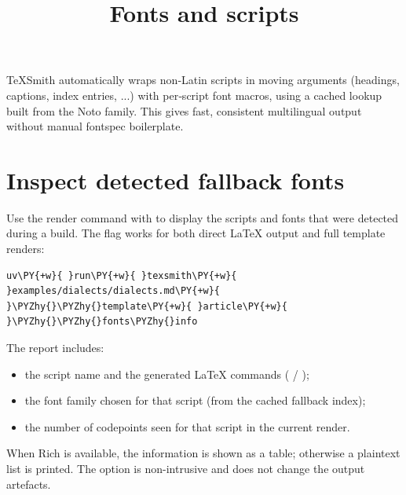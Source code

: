 \documentclass[a4paper,twoside]{article}
\title{Fonts and scripts}
\author{}\date{}
\begin{document}
\maketitle
TeXSmith automatically wraps non‑Latin scripts in moving arguments (headings, captions, index entries, ...) with per‑script font macros, using a cached lookup built from the Noto family. This gives fast, consistent multilingual output without manual fontspec boilerplate.
\section{Inspect detected fallback fonts}
Use the render command with  to display the scripts and fonts that were detected during a build. The flag works for both direct \LaTeX{} output and full template renders:
\begin{tscode}[lang=bash, engine=pygments]
\begin{Verbatim}[commandchars=\\\{\},breaklines, breakanywhere, commandchars=\\\{\}]
uv\PY{+w}{ }run\PY{+w}{ }texsmith\PY{+w}{ }examples/dialects/dialects.md\PY{+w}{ }\PYZhy{}\PYZhy{}template\PY{+w}{ }article\PY{+w}{ }\PYZhy{}\PYZhy{}fonts\PYZhy{}info
\end{Verbatim}
\end{tscode}
The report includes:
\begin{itemize}
\item the script name and the generated \LaTeX{} commands ( / );
\item the font family chosen for that script (from the cached fallback index);
\item the number of codepoints seen for that script in the current render.
\end{itemize}
When Rich is available, the information is shown as a table; otherwise a plaintext list is printed. The option is non-intrusive and does not change the output artefacts.
\end{document}

